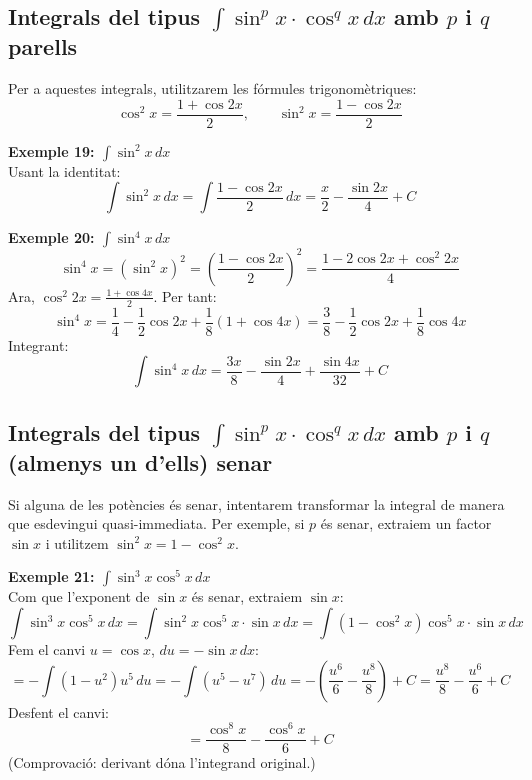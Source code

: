 \documentclass[12pt]{article}
\begin{document}
\subsection{Integrals del tipus \(\displaystyle \int \sin^p x \cdot \cos^q x\,dx\) amb $p$ i $q$ parells}

Per a aquestes integrals, utilitzarem les fórmules trigonomètriques:
\[
\cos^2 x = \frac{1+\cos 2x}{2}, \qquad \sin^2 x = \frac{1-\cos 2x}{2}
\]

\begin{exemple}
\textbf{Exemple 19: $\displaystyle \int \sin^2 x\,dx$}\\
Usant la identitat:
\[
\int \sin^2 x\,dx = \int \frac{1-\cos 2x}{2}\,dx = \frac{x}{2} - \frac{\sin 2x}{4} + C
\]
\end{exemple}

\begin{exemple}
\textbf{Exemple 20: $\displaystyle \int \sin^4 x\,dx$}\\
\[
\sin^4 x = (\sin^2 x)^2 = \left(\frac{1-\cos 2x}{2}\right)^2 = \frac{1 - 2\cos 2x + \cos^2 2x}{4}
\]
Ara, $\cos^2 2x = \frac{1+\cos 4x}{2}$. Per tant:
\[
\sin^4 x = \frac{1}{4} - \frac{1}{2}\cos 2x + \frac{1}{8}(1+\cos 4x) = \frac{3}{8} - \frac{1}{2}\cos 2x + \frac{1}{8}\cos 4x
\]
Integrant:
\[
\int \sin^4 x\,dx = \frac{3x}{8} - \frac{\sin 2x}{4} + \frac{\sin 4x}{32} + C
\]
\end{exemple}

\subsection{Integrals del tipus \(\displaystyle \int \sin^p x \cdot \cos^q x\,dx\) amb $p$ i $q$ (almenys un d'ells) senar}

Si alguna de les potències és senar, intentarem transformar la integral de manera que esdevingui quasi-immediata. Per exemple, si $p$ és senar, extraiem un factor $\sin x$ i utilitzem $\sin^2 x = 1-\cos^2 x$.

\begin{exemple}
\textbf{Exemple 21: $\displaystyle \int \sin^3 x \cos^5 x\,dx$}\\
Com que l'exponent de $\sin x$ és senar, extraiem $\sin x$:
\[
\int \sin^3 x \cos^5 x\,dx = \int \sin^2 x \cos^5 x \cdot \sin x\,dx = \int (1-\cos^2 x)\cos^5 x \cdot \sin x\,dx
\]
Fem el canvi $u = \cos x$, $du = -\sin x\,dx$:
\[
= -\int (1-u^2)u^5\,du = -\int (u^5 - u^7)\,du = -\left(\frac{u^6}{6} - \frac{u^8}{8}\right) + C = \frac{u^8}{8} - \frac{u^6}{6} + C
\]
Desfent el canvi:
\[
= \frac{\cos^8 x}{8} - \frac{\cos^6 x}{6} + C
\]
(Comprovació: derivant dóna l'integrand original.)
\end{exemple}
\end{document}
